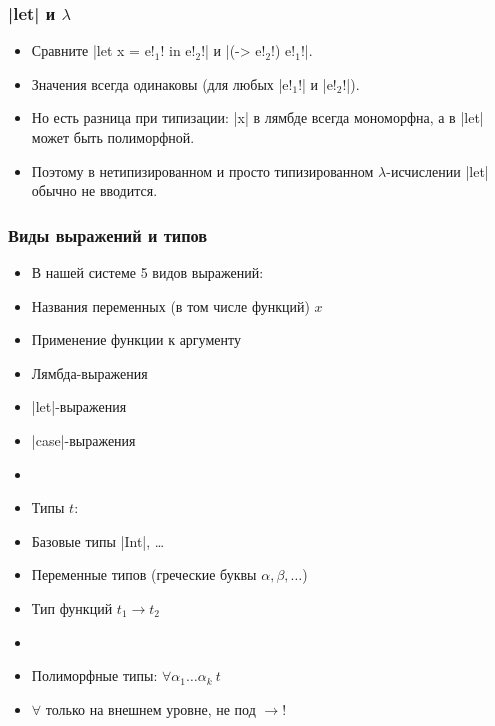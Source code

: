 \documentclass[11pt]{beamer}
\begin{document}
\begin{frame}[fragile]
  \frametitle{\haskinline|let| и $\lambda$}
  \begin{itemize}
    \item Сравните \haskinline|let x = e!$_1$! in e!$_2$!| и \haskinline|(\x -> e!$_2$!) e!$_1$!|.
          \pause
    \item Значения всегда одинаковы (для любых \haskinline|e!$_1$!| и \haskinline|e!$_2$!|).
          \pause
    \item Но есть разница при типизации: \pause \haskinline|x| в лямбде всегда мономорфна, а в \haskinline|let| может быть полиморфной.
          \pause
    \item Поэтому в нетипизированном и просто типизированном $\lambda$-исчислении \haskinline|let| обычно не вводится.
  \end{itemize}
\end{frame}

\begin{frame}[fragile]
  \frametitle{Виды выражений и типов}
  \begin{itemize}
    \item В нашей системе 5 видов выражений:
          \pause
    \item Названия переменных (в том числе функций) $x$
    \item Применение функции к аргументу
    \item Лямбда-выражения
    \item \haskinline|let|-выражения
    \item \haskinline|case|-выражения
    \item[]
      \pause
    \item Типы $t$:
          \pause
    \item Базовые типы \haskinline|Int|, \ldots
    \item Переменные типов (греческие буквы $\alpha, \beta, \ldots$)
    \item Тип функций $t_1 \to t_2$
    \item[]
      \pause
    \item Полиморфные типы: $\forall \alpha_1 \ldots \alpha_k~t$
          \pause
    \item $\forall$ только на внешнем уровне, не под $\to$!
  \end{itemize}
\end{frame}
\end{document}
